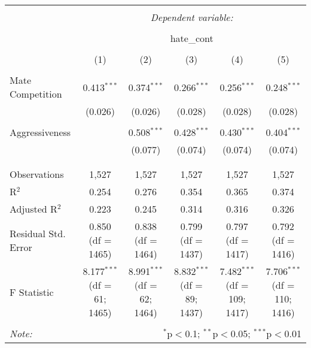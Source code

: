 
\begin{table}[!htbp] \centering 
  \caption{} 
  \label{} 
\begin{tabular}{@{\extracolsep{5pt}}lccccc} 
\\[-1.8ex]\hline 
\hline \\[-1.8ex] 
 & \multicolumn{5}{c}{\textit{Dependent variable:}} \\ 
\cline{2-6} 
\\[-1.8ex] & \multicolumn{5}{c}{hate\_cont} \\ 
\\[-1.8ex] & (1) & (2) & (3) & (4) & (5)\\ 
\hline \\[-1.8ex] 
 Mate Competition & 0.413$^{***}$ & 0.374$^{***}$ & 0.266$^{***}$ & 0.256$^{***}$ & 0.248$^{***}$ \\ 
  & (0.026) & (0.026) & (0.028) & (0.028) & (0.028) \\ 
  & & & & & \\ 
 Aggressiveness &  & 0.508$^{***}$ & 0.428$^{***}$ & 0.430$^{***}$ & 0.404$^{***}$ \\ 
  &  & (0.077) & (0.074) & (0.074) & (0.074) \\ 
  & & & & & \\ 
\hline \\[-1.8ex] 
Observations & 1,527 & 1,527 & 1,527 & 1,527 & 1,527 \\ 
R$^{2}$ & 0.254 & 0.276 & 0.354 & 0.365 & 0.374 \\ 
Adjusted R$^{2}$ & 0.223 & 0.245 & 0.314 & 0.316 & 0.326 \\ 
Residual Std. Error & 0.850 (df = 1465) & 0.838 (df = 1464) & 0.799 (df = 1437) & 0.797 (df = 1417) & 0.792 (df = 1416) \\ 
F Statistic & 8.177$^{***}$ (df = 61; 1465) & 8.991$^{***}$ (df = 62; 1464) & 8.832$^{***}$ (df = 89; 1437) & 7.482$^{***}$ (df = 109; 1417) & 7.706$^{***}$ (df = 110; 1416) \\ 
\hline 
\hline \\[-1.8ex] 
\textit{Note:}  & \multicolumn{5}{r}{$^{*}$p$<$0.1; $^{**}$p$<$0.05; $^{***}$p$<$0.01} \\ 
\end{tabular} 
\end{table} 
